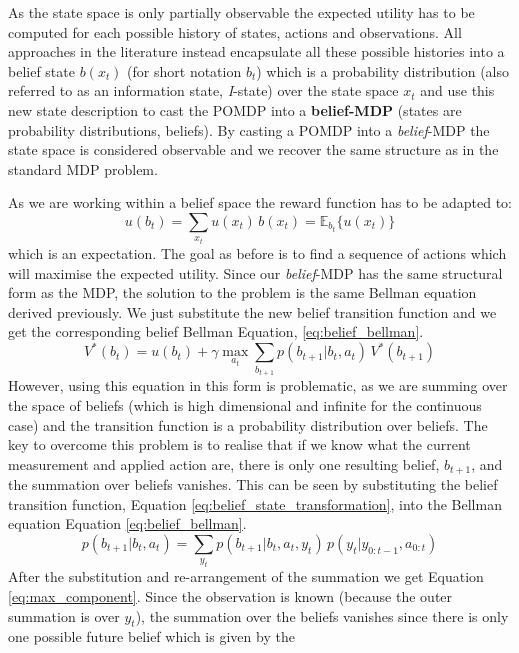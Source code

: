 As the state space is only partially observable the expected utility has to be computed for each possible history of states, actions and observations.
All approaches in the literature instead encapsulate all these possible histories into a belief state $b(x_t)$ (for short notation $b_t$)
which is a probability distribution (also referred to as an information state, \textit{I}-state) over the state 
space $x_t$ and use this new state description to cast the POMDP into a \textbf{belief-MDP} (states are probability distributions, 
beliefs). By casting a POMDP into a \textit{belief}-MDP the state space is considered observable and we recover the same structure 
as in the standard MDP problem.

As we are working within a belief space the reward function has to be adapted to:
\begin{equation}
  u(b_t) = \sum_{x_t} u(x_t)\, b(x_t) = \mathbb{E}_{b_t}\{u(x_t)\}
\end{equation}
which is an expectation. The goal as before is to find a sequence of actions 
which will maximise the expected utility. Since our \textit{belief}-MDP has the same structural form as the MDP, the solution 
to the problem is the same Bellman equation derived previously. We just substitute the new belief transition function 
and we get the corresponding belief Bellman Equation, \ref{eq:belief_bellman}.
\begin{equation}\label{eq:belief_bellman}
 V^*(b_t) = u(b_t) + \gamma \max_{a_t} \sum_{b_{t+1}} p(b_{t+1}|b_t,a_t)\,V^*(b_{t+1})
\end{equation}
However, using this equation in this form is problematic, as we are summing over the space of beliefs (which is high dimensional 
and infinite for the continuous case) and the transition function is a probability distribution over beliefs. 
The key to overcome this problem is to realise that if we know what the current measurement and applied action are, 
there is only one resulting belief, $b_{t+1}$, and
the summation over beliefs vanishes. This can be seen by substituting the belief transition function,
Equation \ref{eq:belief_state_transformation}, into the Bellman equation Equation \ref{eq:belief_bellman}.
\begin{equation}\label{eq:belief_state_transformation}
 p(b_{t+1}|b_t,a_t) = \sum_{y_t} p(b_{t+1}|b_t,a_t,y_t)\,p(y_t|y_{0:t-1},a_{0:t})
\end{equation}
After the substitution and re-arrangement of the summation we get Equation \ref{eq:max_component}. 
Since the observation is known (because the outer summation is over $y_t$), the summation over the beliefs vanishes since there is only one possible future belief which is given by the 
